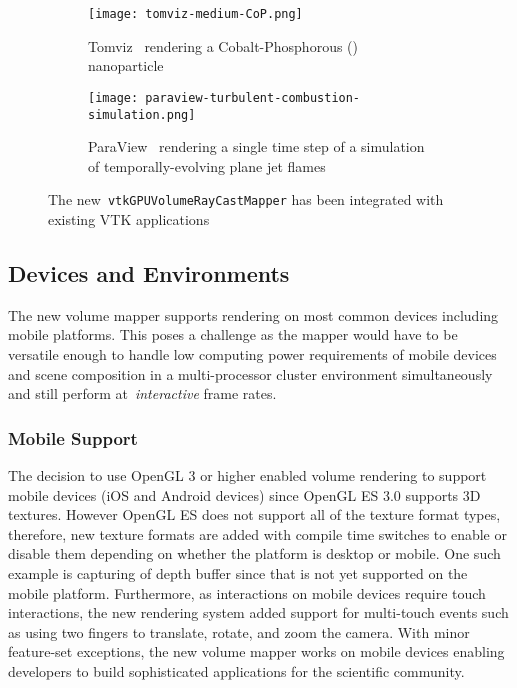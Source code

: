 \begin{figure}[h!]
  \begin{subfigure}[t]{\columnwidth}
    \texttt{[image: tomviz-medium-CoP.png]}
    \caption{Tomviz~\protect\citep{hanwell_tomviz_2014} rendering a
      Cobalt-Phosphorous ()
      nanoparticle~\protect\citep{levin_nanomaterial_2016}}
    \label{fig:tomviz-cop}
  \end{subfigure}
  \begin{subfigure}[t]{\columnwidth}
    \texttt{[image: paraview-turbulent-combustion-simulation.png]}
    \caption{ParaView~\protect\citep{ahrens_paraview:_2005, ayachit_paraview_2015,
      ayachit_paraview_2015-1} rendering a single time step of a simulation of
      temporally-evolving plane jet
      flames~\protect\citep{hiroshi_akiba_visualizing_2007}}
    \label{fig:paraview-turbulent-combustion}
  \end{subfigure}
  \caption{The new~\texttt{vtkGPUVolumeRayCastMapper} has been integrated with
    existing VTK applications}
  \label{fig:application-areas}
\end{figure}

\subsection{Devices and Environments}
\label{devices-and-environments}
The new volume mapper supports rendering on most common devices including mobile
platforms.  This poses a challenge as the mapper would have to be versatile
enough to handle low computing power requirements of mobile devices and scene
composition in a multi-processor cluster environment simultaneously and still
perform at~\textit{interactive} frame rates. 

\subsubsection{Mobile Support}
\label{mobile}
The decision to use OpenGL 3 or higher enabled volume rendering to support
mobile devices (iOS and Android devices) since OpenGL ES 3.0 supports 3D textures.
However OpenGL ES does not support all of the texture format types, therefore,
new texture formats are added with compile time switches to enable or
disable them depending on whether the platform is desktop or mobile. One such
example is capturing of depth buffer since that is not yet supported on the
mobile platform.  Furthermore, as interactions on mobile devices require touch
interactions, the new rendering system added support for multi-touch events
such as using two fingers to translate, rotate, and zoom the camera. With minor
feature-set exceptions, the new volume mapper works on mobile devices enabling
developers to build sophisticated applications for the scientific community.

